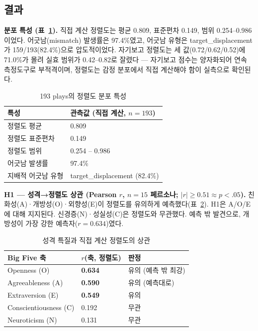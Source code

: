 \documentclass[11pt, a4paper]{article}
\begin{document}
\subsection{결과}

\textbf{분포 특성 (표~\ref{tab:dist}).} 직접 계산 정렬도는 평균 0.809, 표준편차 0.149, 범위 0.254--0.986이었다. 어긋남(mismatch) 발생률은 97.4\%였고, 어긋남 유형은 target\_displacement가 159/193(82.4\%)으로 압도적이었다. 자기보고 정렬도는 세 값(0.72/0.62/0.52)에 71.0\%가 몰려 실효 범위가 0.42--0.82로 잘렸다 --- 자기보고 점수는 양자화되어 연속 측정도구로 부적격이며, 정렬도는 감정 분포에서 직접 계산해야 함이 실측으로 확인된다.

\begin{table}[H]
\centering
\caption{193 plays의 정렬도 분포 특성}
\label{tab:dist}
\begin{tabular}{l l}
\toprule
\textbf{특성} & \textbf{관측값 (직접 계산, $n=193$)} \\
\midrule
정렬도 평균 & 0.809 \\
정렬도 표준편차 & 0.149 \\
정렬도 범위 & 0.254 -- 0.986 \\
어긋남 발생률 & 97.4\% \\
지배적 어긋남 유형 & target\_displacement (82.4\%) \\
\bottomrule
\end{tabular}
\end{table}

\textbf{H1 --- 성격→정렬도 상관 (Pearson $r$, $n=15$ 페르소나; $|r|\geq0.51 \approx p<.05$).} 친화성(A)·개방성(O)·외향성(E)이 정렬도를 유의하게 예측했다(표~\ref{tab:corr}). H1은 A/O/E에 대해 지지된다. 신경증(N)·성실성(C)은 정렬도와 무관했다. 예측 밖 발견으로, 개방성이 가장 강한 예측자($r=0.634$)였다.

\begin{table}[H]
\centering
\caption{성격 특질과 직접 계산 정렬도의 상관}
\label{tab:corr}
\begin{tabular}{l l l}
\toprule
\textbf{Big Five 축} & \textbf{$r$(축, 정렬도)} & \textbf{판정} \\
\midrule
Openness (O) & \textbf{0.634} & 유의 (예측 밖 최강) \\
Agreeableness (A) & \textbf{0.590} & 유의 (예측대로) \\
Extraversion (E) & \textbf{0.549} & 유의 \\
Conscientiousness (C) & 0.192 & 무관 \\
Neuroticism (N) & 0.131 & 무관 \\
\bottomrule
\end{tabular}
\end{table}
\end{document}
